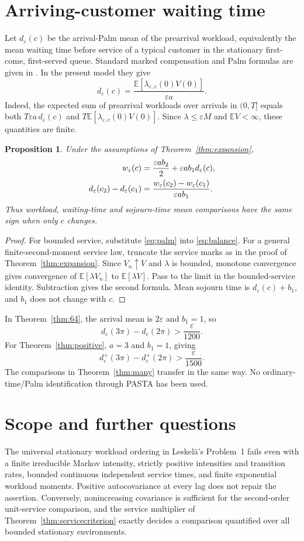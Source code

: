 \documentclass[11pt,reqno]{amsart}
\numberwithin{equation}{section}
\theoremstyle{plain}
\newtheorem{proposition}[theorem]{Proposition}
\theoremstyle{definition}
\newcommand{\E}{\mathbb E}
\newcommand{\1}{\mathbf 1}
\newcommand{\eps}{\varepsilon}
\begin{document}
\section{Arriving-customer waiting time}\label{sec:palm}
Let $d_\eps(c)$ be the arrival-Palm mean of the prearrival workload, equivalently the mean waiting time before service of a typical customer in the stationary first-come, first-served queue. Standard marked compensation and Palm formulas are given in \cite{Bremaud81,BB03,LP18}. In the present model they give
\begin{equation}\label{eq:palm}
 d_\eps(c)=\frac{\E[\lambda_{\eps,c}(0)V(0)]}{\eps a}.
\end{equation}
Indeed, the expected sum of prearrival workloads over arrivals in $(0,T]$ equals both $T\eps a\,d_\eps(c)$ and $T\E[\lambda_{\eps,c}(0)V(0)]$. Since $\lambda\le\eps M$ and $\E V<\infty$, these quantities are finite.

\begin{proposition}\label{prop:palm}
Under the assumptions of Theorem~\ref{thm:expansion},
\begin{align}\label{eq:palmbalance}
 w_\eps(c)&=\frac{\eps ab_2}{2}+\eps ab_1d_\eps(c),\notag\\
 d_\eps(c_2)-d_\eps(c_1)
 &=\frac{w_\eps(c_2)-w_\eps(c_1)}{\eps ab_1}.
\end{align}
Thus workload, waiting-time and sojourn-time mean comparisons have the same sign when only $c$ changes.
\end{proposition}
\begin{proof}
For bounded service, substitute \eqref{eq:palm} into \eqref{eq:balance}. For a general finite-second-moment service law, truncate the service marks as in the proof of Theorem~\ref{thm:expansion}. Since $V_n\uparrow V$ and $\lambda$ is bounded, monotone convergence gives convergence of $\E[\lambda V_n]$ to $\E[\lambda V]$. Pass to the limit in the bounded-service identity. Subtraction gives the second formula. Mean sojourn time is $d_\eps(c)+b_1$, and $b_1$ does not change with $c$.
\end{proof}
In Theorem~\ref{thm:64}, the arrival mean is $2\eps$ and $b_1=1$, so
\[
 d_\eps(3\pi)-d_\eps(2\pi)>\frac{\eps}{1200}.
\]
For Theorem~\ref{thm:positive}, $a=3$ and $b_1=1$, giving
\[
 d^+_\eps(3\pi)-d^+_\eps(2\pi)>\frac{\eps}{1500}.
\]
The comparisons in Theorem~\ref{thm:many} transfer in the same way. No ordinary-time/Palm identification through PASTA has been used.

\section{Scope and further questions}
The universal stationary workload ordering in Leskel\"a's Problem~1 fails even with a finite irreducible Markov intensity, strictly positive intensities and transition rates, bounded continuous independent service times, and finite exponential workload moments. Positive autocovariance at every lag does not repair the assertion. Conversely, nonincreasing covariance is sufficient for the second-order unit-service comparison, and the service multiplier of Theorem~\ref{thm:servicecriterion} exactly decides a comparison quantified over all bounded stationary environments.
\end{document}
